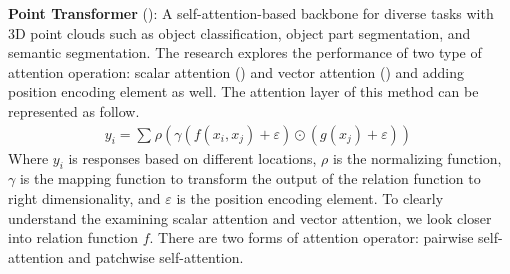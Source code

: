 \textbf{Point Transformer} (\textcolor{cyan}{\cite{zhao2021point}}):
A self-attention-based backbone for diverse tasks with 3D point clouds such as object classification, object part segmentation, and semantic segmentation. The research explores the performance of two type of attention operation: scalar attention (\textcolor{cyan}{\cite{vaswani2017attention}}) and vector attention (\textcolor{cyan}{\cite{zhao2020exploring}}) and adding position encoding element as well. The attention layer of this method can be represented as follow.
\begin{align}
\label{eq: point_transformer}
y_i= \sum^{}{} \rho(\gamma(f(x_i, x_j) +\varepsilon) \odot (g(x_j) +\varepsilon)) \
\end{align}
Where $y_i$ is responses based on different locations, $\rho$ is the normalizing function, $\gamma$ is the mapping function to transform the output of the relation function to right dimensionality, and $\varepsilon$ is the position encoding element. To clearly understand the examining scalar attention and vector attention, we look closer into relation function $f$. There are two forms of attention operator: pairwise self-attention and patchwise self-attention. 

